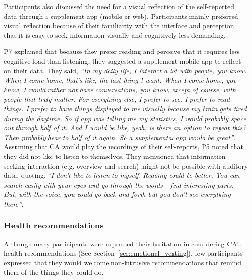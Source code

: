             Participants also discussed the need for a visual reflection of the self-reported data through a supplement app (mobile or web). Participants mainly preferred visual reflection because of their familiarity with the interface and perception that it is easy to seek information visually and cognitively less demanding.
                
            P7 explained that because they prefer reading and perceive that it requires less cognitive load than listening, they suggested a supplement mobile app to reflect on their data. They said,
                \textit{``In my daily life, I interact a lot with people, you know. When I come home, that's like, the last thing I want. When I come home, you know, I would rather not have conversations, you know, except of course, with people that truly matter. For everything else, I prefer to see. I prefer to read things. I prefer to have things displayed to me visually because my brain gets tired during the daytime. So if \acl{app} was telling me my statistics, I would probably space out through half of it. And I would be like, yeah, is there an option to repeat this? Then probably hear to half of it again. So a supplemental app would be great''}.
            Assuming that \acl{CA} would play the recordings of their self-reports, P5 noted that they did not like to listen to themselves. They mentioned that information seeking interaction (e.g. overview and search) might not be possible with auditory data, quoting, 
                \textit{``I don’t like to listen to myself. Reading could be better. You can search easily with your eyes and go through the words - find interesting parts. But, with the voice, you could go back and forth but you don’t see everything there''}.
        

        \subsubsection{Health recommendations}
            Although many participants were expressed their hesitation in considering \ac{CA}'s health recommendations (See Section~\ref{sec:emotional_venting}), few participants expressed that they would welcome non-intrusive recommendations that remind them of the things they could do.
            
